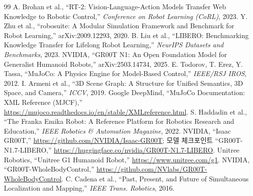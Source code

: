 \begin{thebibliography}{99}\footnotesize
\setlength{\itemsep}{0pt}\setlength{\parskip}{0pt}
 A. Brohan et al., ``RT-2: Vision-Language-Action Models Transfer Web Knowledge to Robotic Control,'' \textit{Conference on Robot Learning (CoRL)}, 2023.
 Y. Zhu et al., ``robosuite: A Modular Simulation Framework and Benchmark for Robot Learning,'' arXiv:2009.12293, 2020.
 B. Liu et al., ``LIBERO: Benchmarking Knowledge Transfer for Lifelong Robot Learning,'' \textit{NeurIPS Datasets and Benchmarks}, 2023.
 NVIDIA, ``GR00T N1: An Open Foundation Model for Generalist Humanoid Robots,'' arXiv:2503.14734, 2025.
 E. Todorov, T. Erez, Y. Tassa, ``MuJoCo: A Physics Engine for Model-Based Control,'' \textit{IEEE/RSJ IROS}, 2012.
 I. Armeni et al., ``3D Scene Graph: A Structure for Unified Semantics, 3D Space, and Camera,'' \textit{ICCV}, 2019.
 Google DeepMind, ``MuJoCo Documentation: XML Reference (MJCF),'' \url{https://mujoco.readthedocs.io/en/stable/XMLreference.html}.
 S. Haddadin et al., ``The Franka Emika Robot: A Reference Platform for Robotics Research and Education,'' \textit{IEEE Robotics \& Automation Magazine}, 2022.
 NVIDIA, ``Isaac GR00T,'' \url{https://github.com/NVIDIA/Isaac-GR00T}; 모델 체크포인트 ``GR00T-N1.7-LIBERO,'' \url{https://huggingface.co/nvidia/GR00T-N1.7-LIBERO}.
 Unitree Robotics, ``Unitree G1 Humanoid Robot,'' \url{https://www.unitree.com/g1}.
 NVIDIA, ``GR00T-WholeBodyControl,'' \url{https://github.com/NVlabs/GR00T-WholeBodyControl}.
 C. Cadena et al., ``Past, Present, and Future of Simultaneous Localization and Mapping,'' \textit{IEEE Trans. Robotics}, 2016.
\end{thebibliography}
